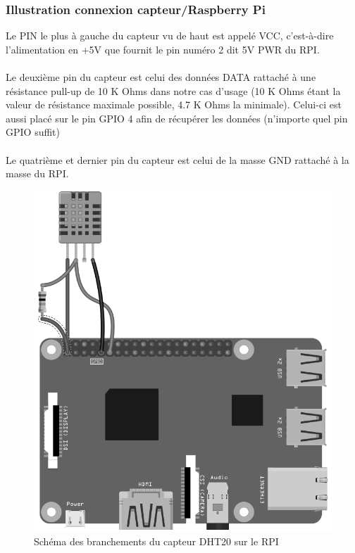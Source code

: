 \documentclass[a4paper]{article}
\begin{document}
\subsubsection{Illustration connexion capteur/Raspberry Pi}
\label{sec:branchementcapteur}
Le PIN le plus à gauche du capteur vu de haut est appelé VCC, c'est-à-dire l'alimentation en +5V que fournit le pin numéro 2 dit 5V PWR du RPI.\\\\Le deuxième pin du capteur est celui des données DATA rattaché à une résistance pull-up de 10 K Ohms dans notre cas d'usage (10 K Ohms étant la valeur de résistance maximale possible, 4.7 K Ohms la minimale). Celui-ci est aussi placé sur le pin GPIO 4 afin de récupérer les données (n'importe quel pin GPIO suffit)\\\\Le quatrième et dernier pin du capteur est celui de la masse GND rattaché à la masse du RPI.
\begin{figure}[!ht]
    \centering
    \includegraphics[scale=0.27]{grayscale_rpi1.png}
    \caption{Schéma des branchements du capteur DHT20 sur le RPI}
\end{figure}
\end{document}
